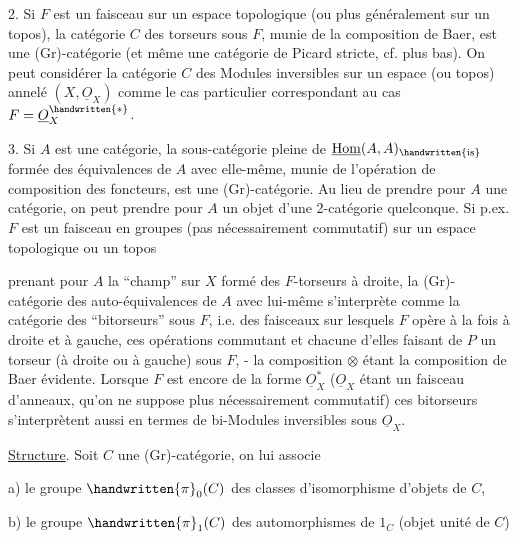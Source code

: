  2. Si $F$ est un faisceau sur un espace topologique (ou plus généralement sur un topos), la catégorie $C$ des torseurs sous $F$, munie de la composition de Baer, est une (Gr)-catégorie (et même une catégorie de Picard stricte, cf. plus bas). On peut considérer la catégorie $C$ des Modules inversibles sur un espace (ou topos)  annelé  $(X,\underline{O}_{X})$ comme le cas particulier correspondant au cas $F=\underline{O}_{X}^{\handwritten{*}}$.

 3. Si $A$ est une catégorie, la sous-catégorie pleine  de $\underline{\mathrm{Hom}}(A,A)_{\handwritten{\mathrm{is}}}$ formée des équivalences de $A$ avec elle-même, munie de l'opération de composition des foncteurs, est une (Gr)-catégorie. Au lieu de prendre pour $A$ une catégorie, on peut  prendre pour $A$ un objet d'une 2-catégorie quelconque. Si p.ex. $F$ est un faisceau en groupes (pas nécessairement commutatif) sur un espace topologique \handwritten{(}ou un topos\handwritten{)}\handwritten{,}

prenant pour $A$ la ``champ'' sur $X$ formé des $F$-torseurs à droite, la (Gr)- catégorie des auto-équivalences de $A$ avec lui-même s'interprète comme la catégorie des ``bitorseurs'' sous $F$, i.e. des faisceaux  sur lesquels $F$ opère à la fois à droite et à gauche, ces opérations commutant et chacune d'elles faisant de $P$ un torseur (à droite ou à gauche) sous $F$, - la composition $\otimes$ étant la composition de Baer évidente. Lorsque $F$ est encore de la forme $\underline{O}_{X}^{*}$ ($\underline{O}_{X}$ étant un faisceau d'anneaux, qu'on ne suppose plus nécessairement commutatif) ces bitorseurs s'interprètent aussi en termes de bi-Modules inversibles sous $\underline{O}_{X}$.

\uline{Structure}.  Soit $C$ une (Gr)-catégorie, on lui associe

a) le groupe $\handwritten{\pi}_{0}(C)$ des classes d'isomorphisme d'objets de $C$,

b) le groupe $\handwritten{\pi}_{1}(C)$ des automorphismes de $1_C$ (objet unité de $C$)

